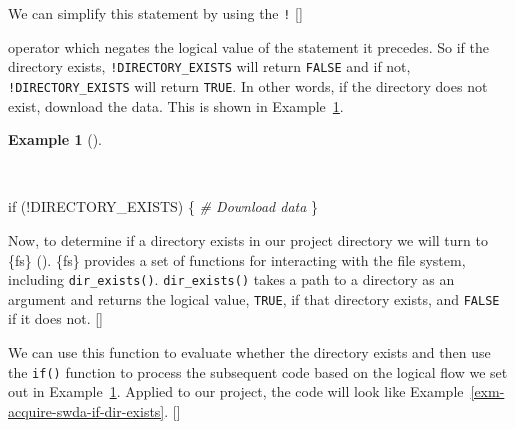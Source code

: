 \documentclass[
  letterpaper,
  krantz1]{latex/krantz-mod}
\newenvironment{Shaded}{\begin{snugshade}}{\end{snugshade}}
\newcommand{\CommentTok}[1]{\textcolor[rgb]{0.00,0.00,0.00}{\textit{#1}}}
\newcommand{\ControlFlowTok}[1]{\textcolor[rgb]{0.00,0.00,0.00}{#1}}
\newcommand{\NormalTok}[1]{\textcolor[rgb]{0.00,0.00,0.00}{#1}}
\newcommand{\SpecialCharTok}[1]{\textcolor[rgb]{0.00,0.00,0.00}{#1}}
\newcommand{\cindex}[1]{%
  \StrSubstitute{#1}{_}{\_}[\temp]%
  \index{\temp}%
}
\theoremstyle{definition}
\theoremstyle{definition}
\newtheorem{example}{Example}[chapter]
\theoremstyle{remark}
\begin{document}
We can simplify this statement by using the \texttt{!}\cindex{"!}
operator which negates the logical value of the statement it precedes.
So if the directory exists, \texttt{!DIRECTORY\_EXISTS} will return
\texttt{FALSE} and if not, \texttt{!DIRECTORY\_EXISTS} will return
\texttt{TRUE}. In other words, if the directory does not exist, download
the data. This is shown in
Example~\ref{exm-acquire-if-dir-exists-simplified}.

\begin{example}[]\protect\hypertarget{exm-acquire-if-dir-exists-simplified}{}\label{exm-acquire-if-dir-exists-simplified}

~

\begin{Shaded}
\begin{Highlighting}[numbers=left,,]
\ControlFlowTok{if}\NormalTok{ (}\SpecialCharTok{!}\NormalTok{DIRECTORY\_EXISTS) \{}
  \CommentTok{\# Download data}
\NormalTok{\}}
\end{Highlighting}
\end{Shaded}

\end{example}

Now, to determine if a directory exists in our project directory we will
turn to \{fs\} (). \{fs\} provides a set of functions for
interacting with the file system, including \texttt{dir\_exists()}.
\texttt{dir\_exists()} takes a path to a directory as an argument and
returns the logical value, \texttt{TRUE}, if that directory exists, and
\texttt{FALSE} if it does not.\cindex{dir_exists()}

We can use this function to evaluate whether the directory exists and
then use the \texttt{if()} function to process the subsequent code based
on the logical flow we set out in
Example~\ref{exm-acquire-if-dir-exists-simplified}. Applied to our
project, the code will look like
Example~\ref{exm-acquire-swda-if-dir-exists}.\cindex{if()}
\end{document}
